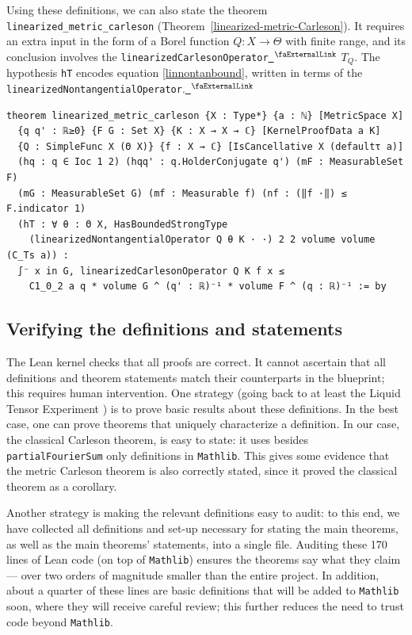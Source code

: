 \documentclass[12pt, reqno]{amsart}
\newcounter{lstlisting}[section]
\let\lean\lstinline
\newcommand{\mathlib}{\texttt{Mathlib}\xspace}
\newcommand{\extlink}{~\ensuremath{{}^\text{\faExternalLink}}}
\theoremstyle{definition}
\theoremstyle{plain}
\begin{document}
Using these definitions, we can also state the theorem \lean{linearized_metric_carleson} (Theorem~\ref{linearized-metric-Carleson}). It requires an extra input in the form of a Borel function $Q\colon X \to \Theta$ with finite range, and its conclusion involves the
\lean{linearizedCarlesonOperator}\href{https://github.com/fpvandoorn/carleson/blob/AFM-frozen/Carleson/Defs.lean#L222-L224}{\extlink} $T_Q$. The hypothesis \lean{hT} encodes equation \eqref{linnontanbound}, written in terms of the
\lean{linearizedNontangentialOperator}.\href{https://github.com/fpvandoorn/carleson/blob/AFM-frozen/Carleson/Defs.lean#L204-L208}{\extlink}
\begin{lstlisting}[mathescape]
theorem linearized_metric_carleson {X : Type*} {a : ℕ} [MetricSpace X]
  {q q' : ℝ≥0} {F G : Set X} {K : X → X → ℂ} [KernelProofData a K]
  {Q : SimpleFunc X (Θ X)} {f : X → ℂ} [IsCancellative X (defaultτ a)]
  (hq : q ∈ Ioc 1 2) (hqq' : q.HolderConjugate q') (mF : MeasurableSet F)
  (mG : MeasurableSet G) (mf : Measurable f) (nf : (‖f ·‖) ≤ F.indicator 1)
  (hT : ∀ θ : Θ X, HasBoundedStrongType
    (linearizedNontangentialOperator Q θ K · ·) 2 2 volume volume (C_Ts a)) :
  ∫⁻ x in G, linearizedCarlesonOperator Q K f x ≤
    C1_0_2 a q * volume G ^ (q' : ℝ)⁻¹ * volume F ^ (q : ℝ)⁻¹ := by
\end{lstlisting}

\subsection{Verifying the definitions and statements}

The Lean kernel checks that all proofs are correct. It cannot ascertain that all definitions and theorem statements match their counterparts in the blueprint; this requires human intervention.
One strategy (going back to at least the Liquid Tensor Experiment \cite{LTEDefinitions})
is to prove basic results about these definitions.
In the best case, one can prove theorems that uniquely characterize a definition.
In our case, the classical Carleson theorem,  is easy to state:
it uses besides \lean{partialFourierSum} only definitions in \mathlib.
This gives some evidence that the metric Carleson theorem is also correctly stated,
since it proved the classical theorem as a corollary.

Another strategy is making the relevant definitions easy to audit: to this end, we have collected all definitions and set-up necessary for stating the main theorems, as well as the main theorems' statements, into a single file. Auditing these 170 lines of Lean code (on top of \mathlib) ensures the theorems say what they claim --- over two orders of magnitude smaller than the entire project.
In addition, about a quarter of these lines are basic definitions that will be added to \mathlib soon, where they will receive careful review; this further reduces the need to trust code beyond \mathlib.
\end{document}

